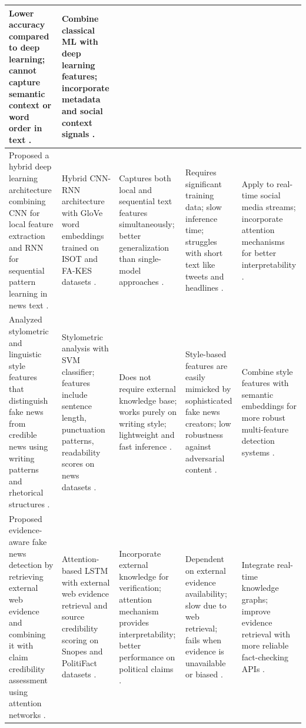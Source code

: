 \documentclass[runningheads]{llncs}
\begin{document}
\begin{longtable}{|p{}|p{}|p{}|p{}|p{}|}
Lower accuracy compared to deep learning; cannot capture semantic context or word order in text \cite{Aphiwongsophon2021Detecting}. &
Combine classical ML with deep learning features; incorporate metadata and social context signals \cite{Aphiwongsophon2021Detecting}. \\ \hline
Proposed a hybrid deep learning architecture combining CNN for local feature extraction and RNN for sequential pattern learning in news text \cite{Nasir2021FakeNews}. &
Hybrid CNN-RNN architecture with GloVe word embeddings trained on ISOT and FA-KES datasets \cite{Nasir2021FakeNews}. &
Captures both local and sequential text features simultaneously; better generalization than single-model approaches \cite{Nasir2021FakeNews}. &
Requires significant training data; slow inference time; struggles with short text like tweets and headlines \cite{Nasir2021FakeNews}. &
Apply to real-time social media streams; incorporate attention mechanisms for better interpretability \cite{Nasir2021FakeNews}. \\ \hline
Analyzed stylometric and linguistic style features that distinguish fake news from credible news using writing patterns and rhetorical structures \cite{Przybyla2020Capturing}. &
Stylometric analysis with SVM classifier; features include sentence length, punctuation patterns, readability scores on news datasets \cite{Przybyla2020Capturing}. &
Does not require external knowledge base; works purely on writing style; lightweight and fast inference \cite{Przybyla2020Capturing}. &
Style-based features are easily mimicked by sophisticated fake news creators; low robustness against adversarial content \cite{Przybyla2020Capturing}. &
Combine style features with semantic embeddings for more robust multi-feature detection systems \cite{Przybyla2020Capturing}. \\ \hline
Proposed evidence-aware fake news detection by retrieving external web evidence and combining it with claim credibility assessment using attention networks \cite{Popat2019DeClarE}. &
Attention-based LSTM with external web evidence retrieval and source credibility scoring on Snopes and PolitiFact datasets \cite{Popat2019DeClarE}. &
Incorporate external knowledge for verification; attention mechanism provides interpretability; better performance on political claims \cite{Popat2019DeClarE}. &
Dependent on external evidence availability; slow due to web retrieval; fails when evidence is unavailable or biased \cite{Popat2019DeClarE}. &
Integrate real-time knowledge graphs; improve evidence retrieval with more reliable fact-checking APIs \cite{Popat2019DeClarE}. \\ \hline

\end{longtable}
\end{document}
